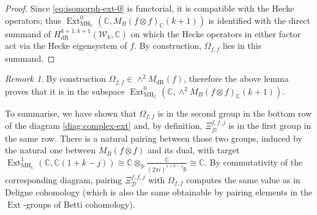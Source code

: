 \documentclass[11pt, a4paper, reqno]{amsart}
\theoremstyle{definition}
\theoremstyle{plain}
\theoremstyle{remark}
\newtheorem*{remark}{Remark}
\DeclareMathOperator{\Ext}{Ext}
\DeclareMathOperator{\dR}{dR}
\newcommand{\numberset}{\mathbb}
\newcommand{\C}{\numberset{C}}
\newcommand{\R}{\numberset{R}}
\newcommand{\KS}{\mathscr{W}}
\newcommand{\cBF}{\Xi}
\newcommand{\MH}{\mathrm{MH}}
\newcommand{\del}{\mathcal{D}}
\begin{document}
  \begin{proof}
   Since \eqref{eq:isomorph-ext-0} is functorial, it is compatible with the Hecke operators; thus $\Ext^0_{\MH_{\C}}(\C, M_B(f\otimes f)_\C(k+1))$ is identified with the direct summand of $H^{k+1, k+1}_{\dR}(\KS_k, \C)$ on which the Hecke operators in either factor act via the Hecke eigensystem of $f$. By construction, $\Omega_{f, f}$ lies in this summand.
  \end{proof}
\begin{remark}
    By construction $\Omega_{f,f} \in \wedge^2 M_{\dR}(f)$, therefore the above lemma proves that it is in the subspace $\Ext^0_{\MH_\C}(\C, \wedge^2 M_B(f\otimes f)_\C(k+1))$.
\end{remark}
To summarise, we have shown that $\Omega_{f,f}$ is in the second group in the bottom row of the diagram \ref{diag:complex-ext} and, by definition, $\cBF_{\del}^{f,f,j}$ is in the first group in the same row. There is a natural pairing between those two groups, induced by the natural one between $M_B(f\otimes f)$ and its dual, with target $\Ext^1_{\MH_\C}(\C, \C(1+k-j)) \cong \C \otimes_{\R} \frac{\C}{(2 \pi i)^{1 + k - j} \R} \cong \C$. By commutativity of the corresponding diagram, pairing $\cBF_{\del}^{f,f,j}$ with $\Omega_{f,f}$ computes the same value as in Deligne cohomology (which is also the same obtainable by pairing elements in the $\Ext$-groups of Betti cohomology).
\end{document}
